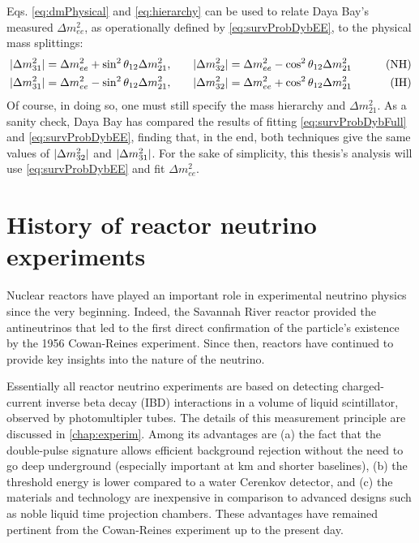 \documentclass[../thesis.tex]{subfiles}
\begin{document}
Eqs. \eqref{eq:dmPhysical} and \eqref{eq:hierarchy} can be used to relate Daya
Bay's measured \(\Delta m^2_{ee}\), as operationally defined by
\eqref{eq:survProbDybEE}, to the physical mass splittings:
\begin{align*}
  \lvert \Delta m^2_{31}\rvert = \Delta m^2_{ee} + \sin^2 \theta_{12} \Delta m^2_{21}, \qquad
  & \lvert \Delta m^2_{32}\rvert = \Delta m^2_{ee} - \cos^2 \theta_{12} \Delta m^2_{21} \qquad
  & \text{(NH)}\\
  \lvert \Delta m^2_{31}\rvert = \Delta m^2_{ee} - \sin^2 \theta_{12} \Delta m^2_{21}, \qquad
  & \lvert \Delta m^2_{32}\rvert = \Delta m^2_{ee} + \cos^2 \theta_{12} \Delta m^2_{21} \qquad
  & \text{(IH)}
\end{align*}
Of course, in doing so, one must still specify the mass hierarchy and \(\Delta
m^2_{21}.\) As a sanity check, Daya Bay has compared the results of fitting
\eqref{eq:survProbDybFull} and \eqref{eq:survProbDybEE}, finding that, in the
end, both techniques give the same values of \(\lvert \Delta m^2_{32}\rvert\) and
\(\lvert \Delta m^2_{31}\rvert\). For the sake of simplicity, this thesis's analysis
will use \eqref{eq:survProbDybEE} and fit \(\Delta m^2_{ee}\).

\section{History of reactor neutrino experiments}
\label{sec:introReactor}

Nuclear reactors have played an important role in experimental neutrino physics
since the very beginning. Indeed, the Savannah River reactor provided the
antineutrinos that led to the first direct confirmation of the particle's
existence by the 1956 Cowan-Reines experiment. Since then, reactors have
continued to provide key insights into the nature of the neutrino.

Essentially all reactor neutrino experiments are based on detecting
charged-current inverse beta decay (IBD) interactions in a volume of liquid
scintillator, observed by photomultipler tubes. The details of this measurement
principle are discussed in \autoref{chap:experim}. Among its advantages are (a)
the fact that the double-pulse signature allows efficient background rejection
without the need to go deep underground (especially important at km and shorter
baselines), (b) the threshold energy is lower compared to a water Cerenkov
detector, and (c) the materials and technology are inexpensive in comparison to
advanced designs such as noble liquid time projection chambers. These advantages
have remained pertinent from the Cowan-Reines experiment up to the present day.
\end{document}
